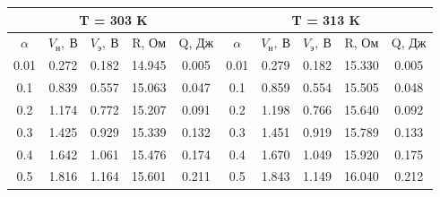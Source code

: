 \documentclass[a4paper, 12pt]{article}%
\begin{document}
	\begin{table}[H]
		\centering
		\begin{tabular}{|ccccc|ccccc|}
			\hline
			\multicolumn{5}{|c|}{T = 303 K}                                                                                                            & \multicolumn{5}{c|}{T = 313 K}                                                                                                            \\ \hline
			\multicolumn{1}{|c|}{$\alpha$} & \multicolumn{1}{c|}{$V_{н}, ~ В$} & \multicolumn{1}{c|}{$V_{э}, ~ В$} & \multicolumn{1}{c|}{R, Ом} & Q, Дж & \multicolumn{1}{c|}{$\alpha$} & \multicolumn{1}{c|}{$V_{н}, ~ В$} & \multicolumn{1}{c|}{$V_{э}, ~ В$} & \multicolumn{1}{c|}{R, Ом} & Q, Дж \\ \hline
			\multicolumn{1}{|c|}{0.01}  & \multicolumn{1}{c|}{0.272}   & \multicolumn{1}{c|}{0.182}     & \multicolumn{1}{c|}{14.945}  & 0.005      & \multicolumn{1}{c|}{0.01}  & \multicolumn{1}{c|}{0.279}   & \multicolumn{1}{c|}{0.182}     & \multicolumn{1}{c|}{15.330}  & 0.005      \\ \hline
			\multicolumn{1}{|c|}{0.1}   & \multicolumn{1}{c|}{0.839}   & \multicolumn{1}{c|}{0.557}     & \multicolumn{1}{c|}{15.063}  & 0.047      & \multicolumn{1}{c|}{0.1}   & \multicolumn{1}{c|}{0.859}   & \multicolumn{1}{c|}{0.554}     & \multicolumn{1}{c|}{15.505}  & 0.048      \\ \hline
			\multicolumn{1}{|c|}{0.2}   & \multicolumn{1}{c|}{1.174}   & \multicolumn{1}{c|}{0.772}     & \multicolumn{1}{c|}{15.207}  & 0.091      & \multicolumn{1}{c|}{0.2}   & \multicolumn{1}{c|}{1.198}   & \multicolumn{1}{c|}{0.766}     & \multicolumn{1}{c|}{15.640}  & 0.092      \\ \hline
			\multicolumn{1}{|c|}{0.3}   & \multicolumn{1}{c|}{1.425}   & \multicolumn{1}{c|}{0.929}     & \multicolumn{1}{c|}{15.339}  & 0.132      & \multicolumn{1}{c|}{0.3}   & \multicolumn{1}{c|}{1.451}   & \multicolumn{1}{c|}{0.919}     & \multicolumn{1}{c|}{15.789}  & 0.133      \\ \hline
			\multicolumn{1}{|c|}{0.4}   & \multicolumn{1}{c|}{1.642}   & \multicolumn{1}{c|}{1.061}     & \multicolumn{1}{c|}{15.476}  & 0.174      & \multicolumn{1}{c|}{0.4}   & \multicolumn{1}{c|}{1.670}   & \multicolumn{1}{c|}{1.049}     & \multicolumn{1}{c|}{15.920}  & 0.175      \\ \hline
			\multicolumn{1}{|c|}{0.5}   & \multicolumn{1}{c|}{1.816}   & \multicolumn{1}{c|}{1.164}     & \multicolumn{1}{c|}{15.601}  & 0.211      & \multicolumn{1}{c|}{0.5}   & \multicolumn{1}{c|}{1.843}   & \multicolumn{1}{c|}{1.149}     & \multicolumn{1}{c|}{16.040}  & 0.212      \\ \hline

\end{tabular}
\end{table}
\end{document}
